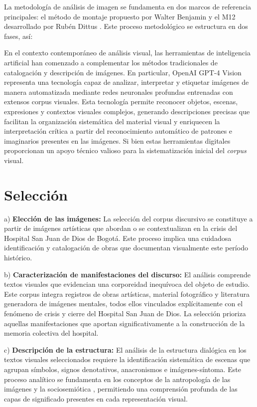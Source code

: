 La metodología de análisis de imagen se fundamenta en dos marcos de referencia principales: el método de montaje propuesto por Walter Benjamin \parencite{BuckMorss1989} y el M12 desarrollado por Rubén Dittus \parencite{Aliaga2022}. Este proceso metodológico se estructura en dos fases, así:

\textcolor{edit30sept}{En el contexto contemporáneo de análisis visual, las herramientas de inteligencia artificial han comenzado a complementar los métodos tradicionales de catalogación y descripción de imágenes. En particular, OpenAI GPT-4 Vision representa una tecnología capaz de analizar, interpretar y etiquetar imágenes de manera automatizada mediante redes neuronales profundas entrenadas con extensos corpus visuales. Esta tecnología permite reconocer objetos, escenas, expresiones y contextos visuales complejos, generando descripciones precisas que facilitan la organización sistemática del material visual y enriquecen la interpretación crítica a partir del reconocimiento automático de patrones e imaginarios presentes en las imágenes. Si bien estas herramientas digitales proporcionan un apoyo técnico valioso para la sistematización inicial del \textit{corpus} visual.}
\section{Selección}

a) \textbf{Elección de las imágenes:} La selección del corpus discursivo se constituye a partir de imágenes artísticas que abordan o se contextualizan en la crisis del Hospital San Juan de Dios de Bogotá. Este proceso implica una cuidadosa identificación y catalogación de obras que documentan visualmente este período histórico.

b) \textbf{Caracterización de manifestaciones del discurso:} El análisis comprende textos visuales que evidencian una corporeidad inequívoca del objeto de estudio. Este corpus integra registros de obras artísticas, material fotográfico y literatura generadora de imágenes mentales, todos ellos vinculados explícitamente con el fenómeno de crisis y cierre del Hospital San Juan de Dios. La selección prioriza aquellas manifestaciones que aportan significativamente a la construcción de la memoria colectiva del hospital.

c) \textbf{Descripción de la estructura:} El análisis de la estructura dialógica en los textos visuales seleccionados requiere la identificación sistemática de escenas que agrupan símbolos, signos denotativos, anacronismos e imágenes-síntoma. Este proceso analítico se fundamenta en los conceptos de la antropología de las imágenes y la sociosemiótica \parencite{Abril2007}, permitiendo una comprensión profunda de las capas de significado presentes en cada representación visual.


